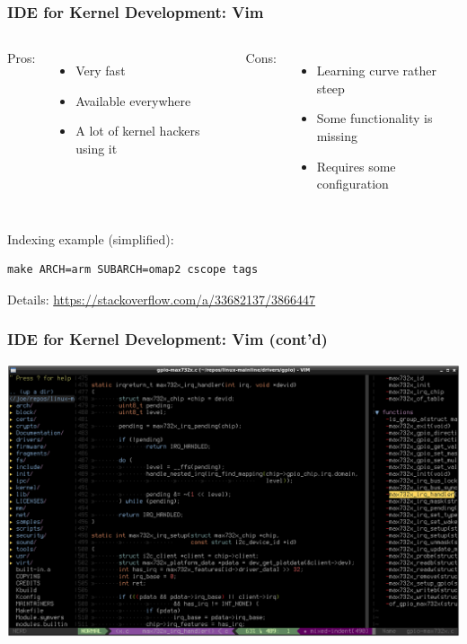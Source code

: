 \begin{frame}[fragile]
  \frametitle{IDE for Kernel Development: Vim}
  \begin{columns}
    Pros:
    \begin{itemize}
      \item Very fast
      \item Available everywhere
      \item A lot of kernel hackers using it
    \end{itemize}
    Cons:
    \begin{itemize}
      \item Learning curve rather steep
      \item Some functionality is missing
      \item Requires some configuration
    \end{itemize}
  \end{columns}
  \bigskip
  Indexing example (simplified):
  \begin{verbatim}
make ARCH=arm SUBARCH=omap2 cscope tags
  \end{verbatim}
  Details: \href{https://stackoverflow.com/a/33682137/3866447}
                {https://stackoverflow.com/a/33682137/3866447}
\end{frame}

\begin{frame}
  \frametitle{IDE for Kernel Development: Vim (cont'd)}
  \begin{center}
    \includegraphics[scale=0.4]{images/vim.png}
  \end{center}
  \vspace*{-10mm} %
\end{frame}

